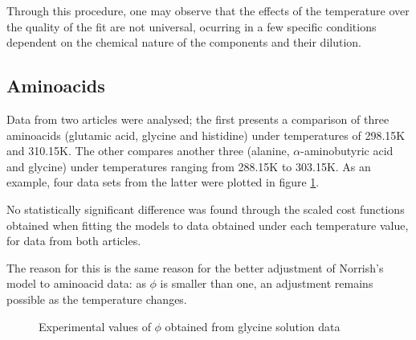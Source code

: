 \documentclass[
	12pt,				%
	openright,
	twoside,
	a4paper,			%
	brazil,			%
	french,				%
	english				%
	]{abntex2}
\begin{document}
Through this procedure, one may observe that the effects of the temperature
over the quality of the fit are not universal, ocurring in a few specific
conditions dependent on the chemical nature of the components and their dilution.

\subsection{Aminoacids}

Data from two articles were analysed; the first \cite{tsurko2007} presents a
comparison of three aminoacids (glutamic acid, glycine and histidine) under
temperatures of 298.15K and 310.15K. The other \cite{romero2006} compares
another three (alanine, $\alpha$-aminobutyric acid and glycine) under
temperatures ranging from 288.15K to 303.15K. As an example, four data sets from
the latter were plotted in figure \ref{fig_temp_amins}.

No statistically significant difference was found through the scaled cost
functions obtained when fitting the models to data obtained under each
temperature value, for data from both articles.

The reason for this is the same reason for the better adjustment of Norrish's
model to aminoacid data: as $\phi$ is smaller than one, an adjustment remains
possible as the temperature changes.

\begin{figure}[h]
	\centering
	\caption{Experimental values of $\phi$ obtained from glycine solution data}
	\label{fig_temp_amins}
\end{figure}
\end{document}
